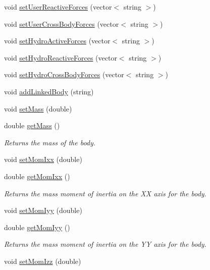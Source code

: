 \begin{DoxyCompactItemize}
\item 
void \hyperlink{class_body_aa3b532c91892c7336309df492cad39d6}{set\-User\-Reactive\-Forces} (vector$<$ string $>$)
\item 
void \hyperlink{class_body_af409e4b49b838e118a57a753879685dc}{set\-User\-Cross\-Body\-Forces} (vector$<$ string $>$)
\item 
void \hyperlink{class_body_a34950bfba0878d2488f91a0f5a1ae918}{set\-Hydro\-Active\-Forces} (vector$<$ string $>$)
\item 
void \hyperlink{class_body_ae26fc5ecce5fd1803ce26bf87d1d2a2b}{set\-Hydro\-Reactive\-Forces} (vector$<$ string $>$)
\item 
void \hyperlink{class_body_a47aed2abb4a77b9da93a803f7fdd5e31}{set\-Hydro\-Cross\-Body\-Forces} (vector$<$ string $>$)
\item 
void \hyperlink{class_body_a1bcd87df62f0cdd063c01799c1631ebd}{add\-Linked\-Body} (string)
\item 
void \hyperlink{class_body_a896b660a9d001422f5d2b0b4e6d77b98}{set\-Mass} (double)
\item 
double \hyperlink{class_body_ac58abb2931cc56f2c0ff85700175a4d9}{get\-Mass} ()
\begin{DoxyCompactList}\small\item\em Returns the mass of the body. \end{DoxyCompactList}\item 
void \hyperlink{class_body_a2c9b1a384512fdd3fc5bb017289d1478}{set\-Mom\-Ixx} (double)
\item 
double \hyperlink{class_body_ac95aca5c89a30c42db96a8cfacecd89d}{get\-Mom\-Ixx} ()
\begin{DoxyCompactList}\small\item\em Returns the mass moment of inertia on the X\-X axis for the body. \end{DoxyCompactList}\item 
void \hyperlink{class_body_a4a92bccc2f40ba7d5fe754428d41195f}{set\-Mom\-Iyy} (double)
\item 
double \hyperlink{class_body_ade00f804ca3c40245527f5554580f331}{get\-Mom\-Iyy} ()
\begin{DoxyCompactList}\small\item\em Returns the mass moment of inertia on the Y\-Y axis for the body. \end{DoxyCompactList}\item 
void \hyperlink{class_body_a99662066111dcde2dd6fdbf8dd2230dd}{set\-Mom\-Izz} (double)
\item 

\end{DoxyCompactItemize}
